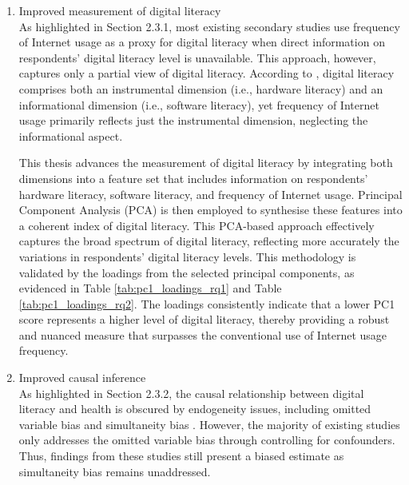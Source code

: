 \begin{enumerate}[wide=0pt, leftmargin=*, labelwidth=0pt, labelindent=\parindent, itemindent=0pt]
    \item Improved measurement of digital literacy \\
    As highlighted in Section 2.3.1, most existing secondary studies use frequency of Internet usage as a proxy for digital literacy when direct information on respondents' digital literacy level is unavailable. This approach, however, captures only a partial view of digital literacy. According to \textcite[p. 21]{vandijk_deepening_2005}, digital literacy comprises both an instrumental dimension (i.e., hardware literacy) and an informational dimension (i.e., software literacy), yet frequency of Internet usage primarily reflects just the instrumental dimension, neglecting the informational aspect.

    This thesis advances the measurement of digital literacy by integrating both dimensions into a feature set that includes information on respondents' hardware literacy, software literacy, and frequency of Internet usage. Principal Component Analysis (PCA) is then employed to synthesise these features into a coherent index of digital literacy. This PCA-based approach effectively captures the broad spectrum of digital literacy, reflecting more accurately the variations in respondents' digital literacy levels. This methodology is validated by the loadings from the selected principal components, as evidenced in Table \ref{tab:pc1_loadings_rq1} and Table \ref{tab:pc1_loadings_rq2}. The loadings consistently indicate that a lower PC1 score represents a higher level of digital literacy, thereby providing a robust and nuanced measure that surpasses the conventional use of Internet usage frequency.

    \item Improved causal inference \\
    As highlighted in Section 2.3.2, the causal relationship between digital literacy and health is obscured by endogeneity issues, including omitted variable bias and simultaneity bias \parencite{drentea_association_2008,hong_digital_2017}. However, the majority of existing studies only addresses the omitted variable bias through controlling for confounders. Thus, findings from these studies still present a biased estimate as simultaneity bias remains unaddressed.


\end{enumerate}
